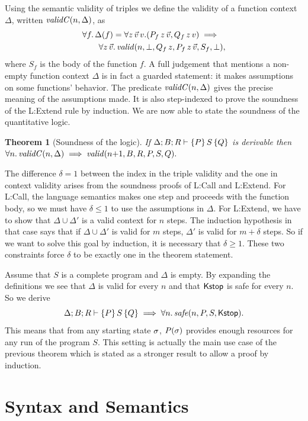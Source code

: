 \documentclass[nocopyrightspace,preprint,pldi]{sigplanconf-pldi15}
\newtheorem{theorem}{Theorem}
\begin{document}
{Using the semantic validity of triples we define the validity
of a function context $\Delta$, written $\mathit{validC}(n,\Delta)$, as
\begin{align*}
  &\forall f .\, \Delta(f) =
    \forall z \, \vec v \, v .(P_f \, z \, \vec v, Q_f \, z \, v)
    \implies \\
  &\qquad \forall z \, \vec v .\,
  \mathit{valid}(n,\bot,Q_f \, z,P_f \, z \, \vec v,S_f,\bot) ,
\end{align*}
where $S_f$ is the body of the function $f$. A full
judgement that mentions a non-empty function context
$\Delta$ is in fact a guarded statement: it makes
assumptions on some functions' behavior.  The predicate
$\mathit{validC}(n,\Delta)$ gives the precise meaning of the
assumptions made.  It is also step-indexed to prove the
soundness of the {\sc L:Extend} rule by induction.
%
We are now able to state the soundness of the quantitative logic.
%
\begin{theorem}[Soundness of the logic]
  If $\Delta; B; R \vdash \{P\}\, S\, \{Q\}$ is derivable then
  $
    \forall n .\, \mathit{validC}(n,\Delta)
      \implies \mathit{valid}(n {+} 1,B,R,P,S,Q).
  $
\end{theorem}
%
\noindent
The difference $\delta = 1$ between the index in the triple
validity and the one in context validity arises from
the soundness proofs of {\sc L:Call} and {\sc L:Extend}.  For
{\sc L:Call}, the language semantics makes one step and
proceeds with the function body, so we must have
$\delta \le 1$ to use the assumptions in $\Delta$.
For {\sc L:Extend}, we have to show that $\Delta \cup \Delta'$
is a valid context for $n$ steps.  The induction hypothesis
in that case says that if $\Delta \cup \Delta'$ is valid
for $m$ steps, $\Delta'$ is valid for $m+\delta$ steps.
So if we want to solve this goal by induction, it is
necessary that $\delta \ge 1$.  These two constraints force
$\delta$ to be exactly one in the theorem statement.

Assume that $S$ is a complete program and $\Delta$ is empty.  By
expanding the definitions we see that $\Delta$ is valid
for every $n$ and that $\mathsf{Kstop}$ is safe for every $n$. So
we derive
$$
\Delta; B; R \vdash \{P\}\, S\, \{Q\} \implies   \forall n .\, \mathit{safe}(n,P,S,\mathsf{Kstop}).
$$
This means that from any starting state $\sigma$, $P(\sigma)$
provides enough resources for any run of the program $S$.  This
setting is actually the main use case of the previous theorem
which is stated as a stronger result to allow a proof by
induction.



\section{Syntax and Semantics}
\label{app:sem}

}
\end{document}
